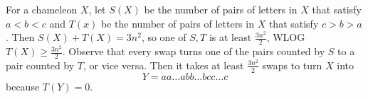For a chameleon $X$, let $S\left(X\right)$ be the number of pairs of letters in $X$ that satisfy $a<b<c$ and $T\left(x\right)$ be the number of pairs of letters in $X$ that satisfy $c>b>a$. Then $S\left(X\right)+T\left(X\right)=3n^2$, so one of $S,T$ is at least $\frac{3n^2}{2}$, WLOG $T\left(X\right)\geq\frac{3n^2}{2}$. Observe that every swap turns one of the pairs counted by $S$ to a pair counted by $T$, or vice versa. Then it takes at least $\frac{3n^2}{2}$ swaps to turn $X$ into \[Y=aa\ldots abb\ldots bcc\ldots c\] because $T\left(Y\right)=0$.